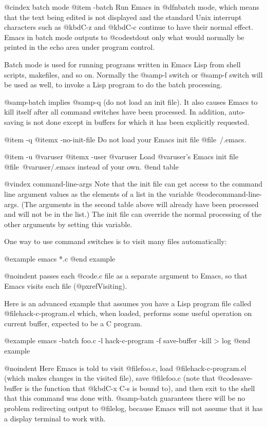 {{{@cindex batch mode
@item -batch
Run Emacs in @dfn{batch mode}, which means that the text being edited is
not displayed and the standard Unix interrupt characters such as @kbd{C-z}
and @kbd{C-c} continue to have their normal effect.  Emacs in batch mode
outputs to @code{stdout} only what would normally be printed in the echo
area under program control.

Batch mode is used for running programs written in Emacs Lisp from
shell scripts, makefiles, and so on.  Normally the @samp{-l} switch
or @samp{-f} switch will be used as well, to invoke a Lisp program
to do the batch processing.

@samp{-batch} implies @samp{-q} (do not load an init file).  It also causes
Emacs to kill itself after all command switches have been processed.  In
addition, auto-saving is not done except in buffers for which it has been
explicitly requested.

@item -q
@itemx -no-init-file
Do not load your Emacs init file @file{~/.emacs}.

@item -u @var{user}
@itemx -user @var{user}
Load @var{user}'s Emacs init file @file{~@var{user}/.emacs} instead of
your own.
@end table

@vindex command-line-args
  Note that the init file can get access to the command line argument
values as the elements of a list in the variable @code{command-line-args}.
(The arguments in the second table above will already have been processed
and will not be in the list.)  The init file can override the normal
processing of the other arguments by setting this variable.

  One way to use command switches is to visit many files automatically:

@example
emacs *.c
@end example

@noindent
passes each @code{.c} file as a separate argument to Emacs, so that Emacs
visits each file (@pxref{Visiting}).
  
  Here is an advanced example that assumes you have a Lisp program
file called @file{hack-c-program.el} which, when loaded, performs some
useful operation on current buffer, expected to be a C program.

@example
emacs -batch foo.c -l hack-c-program -f save-buffer -kill > log
@end example

@noindent
Here Emacs is told to visit @file{foo.c}, load @file{hack-c-program.el}
(which makes changes in the visited file), save @file{foo.c} (note that
@code{save-buffer} is the function that @kbd{C-x C-s} is bound to), and
then exit to the shell that this command was done with.  @samp{-batch}
guarantees there will be no problem redirecting output to @file{log},
because Emacs will not assume that it has a display terminal to work with.

}}}
